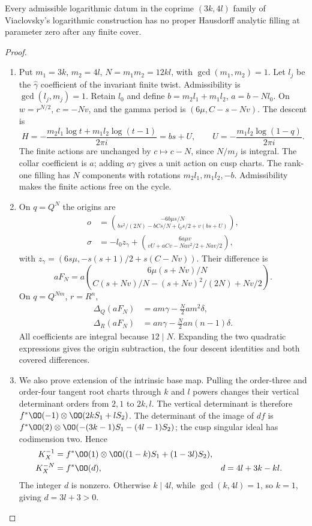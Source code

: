 \begin{theorem}\hypertarget{tag-02RJ}{}\label{night:P2.9}\label{stmt:P2.9}

Every admissible logarithmic datum in the coprime $(3k,4l)$ family of Viaclovsky's logarithmic construction has no proper Hausdorff analytic filling at parameter zero after any finite cover.
\end{theorem}
\begin{proof}
\begin{enumerate}[label=\arabic*.,leftmargin=*]
\item Put $m_1=3k$, $m_2=4l$, $N=m_1m_2=12kl$, with $\gcd(m_1,m_2)=1$. Let $l_j$ be the $\widehat\gamma$ coefficient of the invariant finite twist. Admissibility is $\gcd(l_j,m_j)=1$. Retain $l_0$ and define $b=m_2l_1+m_1l_2$, $a=b-Nl_0$. On $w=r^{N/2}$, $c=-Nv$, and the gamma period is $(6\mu,C-s-Nv)$. The descent is
\[
 H=-\frac{m_2l_1\log t+m_1l_2\log(t-1)}{2\pi i}=bs+U,
 \qquad U=-\frac{m_1l_2\log(1-q)}{2\pi i}.
\]
The finite actions are unchanged by $c\mapsto c-N$, since $N/m_j$ is integral. The collar coefficient is $a$; adding $a\gamma$ gives a unit action on cusp charts. The rank-one filling has $N$ components with rotations $m_2l_1,m_1l_2,-b$. Admissibility makes the finite actions free on the cycle.

\item On $q=Q^N$ the origins are
\begin{align*}
 o&=\binom{-6b\mu s/N}{bs^2/(2N)-bCs/N+l_0s/2+v(bs+U)},\\
 \sigma&=-l_0z_\gamma+\binom{6a\mu v}{vU+aCv-Nav^2/2+Nav/2},
\end{align*}
with $z_\gamma=(6s\mu,-s(s+1)/2+s(C-Nv))$. Their difference is
\[
 aF_N=a\binom{6\mu(s+Nv)/N}{C(s+Nv)/N-(s+Nv)^2/(2N)+Nv/2}.
\]
On $q=Q^{Nm}$, $r=R^n$,
\begin{align*}
 \Delta_Q(aF_N)&=am\gamma-\tfrac N2am^2\delta,\\
 \Delta_R(aF_N)&=an\gamma-\tfrac N2an(n-1)\delta.
\end{align*}
All coefficients are integral because $12\mid N$. Expanding the two quadratic expressions gives the origin subtraction, the four descent identities and both covered differences.

\item We also prove extension of the intrinsic base map. Pulling the order-three and order-four tangent root charts through $k$ and $l$ powers changes their vertical determinant orders from $2,1$ to $2k,l$. The vertical determinant is therefore $f^*\OO(-1)\otimes\OO(2kS_1+lS_2)$. The determinant of the image of $df$ is $f^*\OO(2)\otimes\OO(-(3k-1)S_1-(4l-1)S_2)$; the cusp singular ideal has codimension two. Hence
\begin{align*}
 K_X^{-1}&=f^*\OO(1)\otimes\OO((1-k)S_1+(1-3l)S_2),\\
 K_X^{-N}&=f^*\OO(d),& d&=4l+3k-kl.
\end{align*}
The integer $d$ is nonzero. Otherwise $k\mid4l$, while $\gcd(k,4l)=1$, so $k=1$, giving $d=3l+3>0$.


\end{enumerate}
\end{proof}
